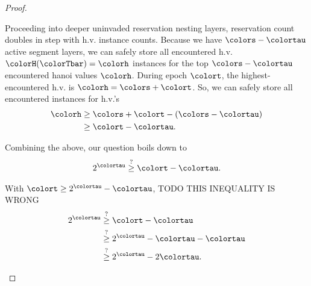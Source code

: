 \begin{proof}
\begin{proofpart}
Proceeding into deeper uninvaded reservation nesting layers, reservation count doubles in step with h.v. instance counts.
Because we have $\colors - \colortau$ active segment layers, we can safely store all encountered h.v. $\colorH(\colorTbar) = \colorh$ instances for the top $\colors - \colortau$ encountered hanoi values $\colorh$.
During epoch $\colort$, the highest-encountered h.v. is $\colorh=\colors + \colort$.
So, we can safely store all encountered instances for h.v.'s
\begin{align*}
\colorh
&\geq
\colors + \colort - (\colors - \colortau)\\
&\geq
\colort - \colortau.
\end{align*}
\end{proofpart}

\begin{proofpart}
Combining the above, our question boils down to
\begin{align*}
2^{\colortau}
\stackrel{?}{\geq} \colort - \colortau.
\end{align*}

With $\colort \geq 2^{\colortau} - \colortau$, TODO THIS INEQUALITY IS WRONG
\begin{align*}
2^{\colortau}
&\stackrel{?}{\geq} \colort - \colortau \\
&\stackrel{?}{\geq} 2^{\colortau} - \colortau - \colortau \\
&\stackrel{?}{\geq} 2^{\colortau} - 2\colortau.
\end{align*}
\end{proofpart}

\end{proof}
